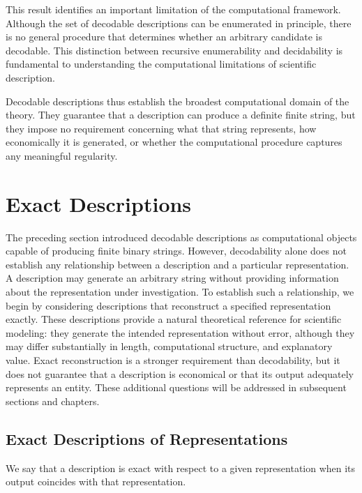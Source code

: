 This result identifies an important limitation of the computational framework. Although the set of decodable descriptions can be enumerated in principle, there is no general procedure that determines whether an arbitrary candidate is decodable. This distinction between recursive enumerability and decidability is fundamental to understanding the computational limitations of scientific description.

Decodable descriptions thus establish the broadest computational domain of the theory. They guarantee that a description can produce a definite finite string, but they impose no requirement concerning what that string represents, how economically it is generated, or whether the computational procedure captures any meaningful regularity.

%
%

\section{Exact Descriptions}
\label{sec:exact_descriptions}

The preceding section introduced decodable descriptions as computational objects capable of producing finite binary strings. However, decodability alone does not establish any relationship between a description and a particular representation. A description may generate an arbitrary string without providing information about the representation under investigation. To establish such a relationship, we begin by considering descriptions that reconstruct a specified representation exactly. These descriptions provide a natural theoretical reference for scientific modeling: they generate the intended representation without error, although they may differ substantially in length, computational structure, and explanatory value. Exact reconstruction is a stronger requirement than decodability, but it does not guarantee that a description is economical or that its output adequately represents an entity. These additional questions will be addressed in subsequent sections and chapters.


\subsection*{Exact Descriptions of Representations}

We say that a description is exact with respect to a given representation when its output coincides with that representation.

